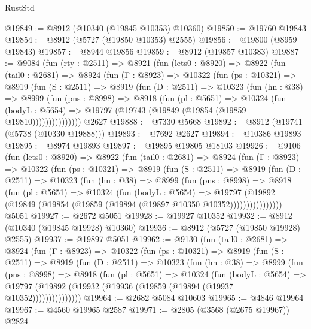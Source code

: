 \begin{lexlean}{RustStd}
\begin{coremodule}
@19849 := @8912 (@10340 (@19845 @10353) @10360)
@19850 := @19760 @19843
@19854 := @8912 (@5727 (@19850 @10353) @2555)
@19856 := @19800 (@8959 @19843)
@19857 := @8944 @19856
@19859 := @8912 (@19857 @10383)
@19887 := @9084
    (fun (rty : @2511) =>
    @8921
      (fun (lets0 : @8920) =>
      @8922
        (fun (tail0 : @2681) =>
        @8924
          (fun (Γ : @8923) =>
          @10322
            (fun (ps : @10321) =>
            @8919
              (fun (S : @2511) =>
              @8919
                (fun (D : @2511) =>
                @10323
                  (fun (hn : @38) =>
                  @8999
                    (fun (pns : @8998) =>
                    @8918
                      (fun (pl : @5651) =>
                      @10324
                        (fun (bodyL : @5654) =>
                        @19797 (@19743 (@19849 (@19854 (@19859 @19810)))))))))))))))
    @2627
@19888 := @7330 @5668
@19892 := @8912 (@19741 (@5738 (@10330 @19888)))
@19893 := @7692 @2627
@19894 := @10386 @19893
@19895 := @8974 @19893
@19897 := @19895 @19805 @18103
@19926 := @9106
    (fun (lets0 : @8920) =>
    @8922
      (fun (tail0 : @2681) =>
      @8924
        (fun (Γ : @8923) =>
        @10322
          (fun (ps : @10321) =>
          @8919
            (fun (S : @2511) =>
            @8919
              (fun (D : @2511) =>
              @10323
                (fun (hn : @38) =>
                @8999
                  (fun (pns : @8998) =>
                  @8918
                    (fun (pl : @5651) =>
                    @10324
                      (fun (bodyL : @5654) =>
                      @19797
                        (@19892
                          (@19849 (@19854 (@19859 (@19894 (@19897 @10350 @10352))))))))))))))))
    @5051
@19927 := @2672 @5051
@19928 := @19927 @10352
@19932 := @8912 (@10340 (@19845 @19928) @10360)
@19936 := @8912 (@5727 (@19850 @19928) @2555)
@19937 := @19897 @5051
@19962 := @9130
    (fun (tail0 : @2681) =>
    @8924
      (fun (Γ : @8923) =>
      @10322
        (fun (ps : @10321) =>
        @8919
          (fun (S : @2511) =>
          @8919
            (fun (D : @2511) =>
            @10323
              (fun (hn : @38) =>
              @8999
                (fun (pns : @8998) =>
                @8918
                  (fun (pl : @5651) =>
                  @10324
                    (fun (bodyL : @5654) =>
                    @19797 (@19892 (@19932 (@19936 (@19859 (@19894 (@19937 @10352)))))))))))))))
@19964 := @2682 @5084 @10603
@19965 := @4846 @19964
@19967 := @4560 @19965 @2587
@19971 := @2805 (@3568 (@2675 @19967)) @2824

\end{coremodule}
\end{lexlean}
